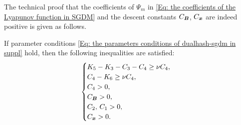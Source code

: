 The technical proof that the coefficients of $\Psi_m$ in \eqref{Eq: the coefficients of the Lyapunov function in SGDM} and the descent constants $C_{\bm{B}}$, $C_{\bm{x}}$ are indeed positive is given as follows.
\begin{lemma}
    \label{lem:lyapunov-coef-positivity} If parameter conditions \eqref{Eq: the parameters conditions of dualhash-sgdm in suppl}
    hold, then the following inequalities are satisfied:
    \begin{align}
        \begin{cases}K_{5}- K_{3}- C_{3}- C_{4}\geq \nu C_{4}, \\ C_{4}- K_{6}\geq \nu C_{4},\\ C_{4}> 0,\\ C_{\bm{B}}> 0 ,\\ C_{2},\, C_{1}> 0, \\ C_{\bm{x}}> 0.\end{cases} \notag
    \end{align}
\end{lemma}
